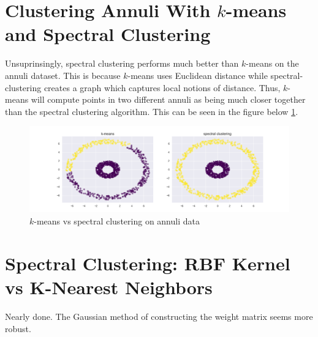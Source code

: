 \documentclass{article}
\begin{document}
\section[short]{Clustering Annuli With $k$-means and Spectral Clustering}

    Unsuprinsingly, spectral clustering performs much better than $k$-means on the annuli dataset. This is because $k$-means uses Euclidean distance while spectral-clustering creates a graph which captures local notions of distance. Thus, $k$-means will compute points in two different annuli as being much closer together than the spectral clustering algorithm. This can be seen in the figure below \ref{fig:annuli}.

    \begin{figure}[ht]
        \label{fig:annuli}
        \includegraphics[width=0.90\linewidth]{images/q6/k-means_vs_spectral_clustering.png}
        \caption{$k$-means vs spectral clustering on annuli data}
    \end{figure}
    \pagebreak

\section[short]{Spectral Clustering: RBF Kernel vs K-Nearest Neighbors}

    Nearly done. The Gaussian method of constructing the weight matrix seems more robust.
             
\end{document}
